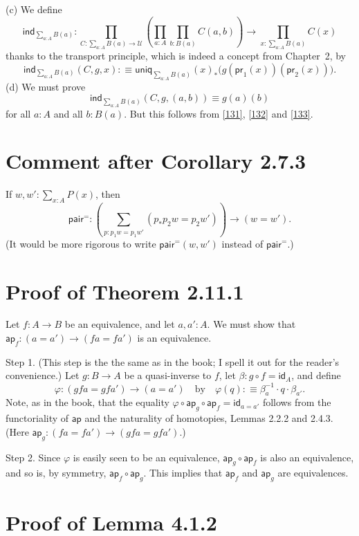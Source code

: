 \documentclass[12pt]{article}
\newcommand{\msf}{\mathsf}
\newcommand{\nn}{\noindent}
\newcommand{\ap}{\mathsf{ap}}
\newcommand{\id}{\mathsf{id}}
\newcommand{\ind}{\mathsf{ind}}
\newcommand{\pr}{\mathsf{pr}}
\newcommand{\uniq}{\mathsf{uniq}}
\newcommand{\U}{\mathcal U}
\begin{document}
\nn(c) We define
$$
\ind_{\sum_{a:A}B(a)} : \prod_{C:\sum_{a:A}B(a)\to\U} 
\left(\prod_{a:A}\prod_{b:B(a)} C(a,b)\right) 
\to \prod_{x:\sum_{a:A}B(a)} C(x)
$$
thanks to the transport principle, which is indeed a concept from Chapter~2, by
\begin{equation}\label{133}
\ind_{\sum_{a:A}B(a)}(C,g,x):
\equiv\uniq_{\sum_{a:A}B(a)}(x)_*\Big(g(\pr_1(x))(\pr_2(x))\Big).
\end{equation}
(d) We must prove 
$$
\ind_{\sum_{a:A}B(a)}(C,g,(a,b))\equiv g(a)(b)
$$
for all $a:A$ and all $b:B(a)$. But this follows from \eqref{131}, \eqref{132} and \eqref{133}.


\section{Comment after Corollary 2.7.3}

If $w,w':\sum_{x:A}P(x)$, then 
$$
\msf{pair}^=:\left(\sum_{p:p_1w=p_1w'}(p_*p_2w=p_2w')\right)\to(w=w').
$$ 
(It would be more rigorous to write $\msf{pair}^=(w,w')$ instead of $\msf{pair}^=$.)


\section{Proof of Theorem 2.11.1}

Let $f:A\to B$ be an equivalence, and let $a,a':A$. We must show that $\ap_f:(a=a')\to (fa=fa')$ is an equivalence.

Step 1. (This step is the the same as in the book; I spell it out for the reader's convenience.) Let $g:B\to A$ be a quasi-inverse to $f$, let $\beta:g\circ f=\id_A$, and define 
$$
\varphi:(gfa=gfa')\to(a=a')\quad\text{by}\quad\varphi(q):\equiv\beta_a^{-1}\cdot q\cdot\beta_{a'}.
$$ 
Note, as in the book, that the equality $\varphi\circ\ap_g\circ\ap_f=\id_{a=a'}$ follows from the functoriality of $\ap$ and the naturality of homotopies, Lemmas 2.2.2 and 2.4.3. (Here $\ap_g:(fa=fa')\to (gfa=gfa')$.)

Step 2. Since $\varphi$ is easily seen to be an equivalence, $\ap_g\circ\ap_f$ is also an equivalence, and so is, by symmetry, $\ap_f\circ\ap_g$. This implies that $\ap_f$ and $\ap_g$ are equivalences.



\section{Proof of Lemma 4.1.2}
\end{document}
